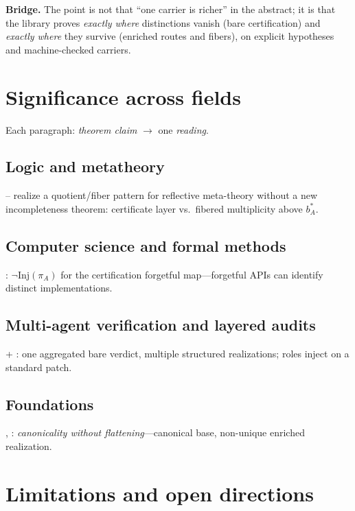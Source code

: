 \documentclass[11pt]{article}
\begin{document}
\smallskip
\noindent\textbf{Bridge.}
The point is not that ``one carrier is richer'' in the abstract; it is that the library proves \emph{exactly where} distinctions vanish (bare certification) and \emph{exactly where} they survive (enriched routes and fibers), on explicit hypotheses and machine-checked carriers.

\section{Significance across fields}\label{sec:significance}

Each paragraph: \emph{theorem claim} $\to$ one \emph{reading}.

\subsection{Logic and metatheory}\label{sec:significance-logic}
-- realize a quotient/fiber pattern for reflective meta-theory without a new incompleteness theorem: certificate layer vs.\ fibered multiplicity above $b^\ast_A$.

\subsection{Computer science and formal methods}\label{sec:significance-cs}
: $\neg\mathrm{Inj}(\pi_A)$ for the certification forgetful map---forgetful APIs can identify distinct implementations.

\subsection{Multi-agent verification and layered audits}\label{sec:significance-ai}
 + : one aggregated bare verdict, multiple structured realizations; roles inject on a standard patch.

\subsection{Foundations}\label{sec:significance-foundations}
, : \emph{canonicality without flattening}---canonical base, non-unique enriched realization.

\section{Limitations and open directions}\label{sec:limitations}
\end{document}
